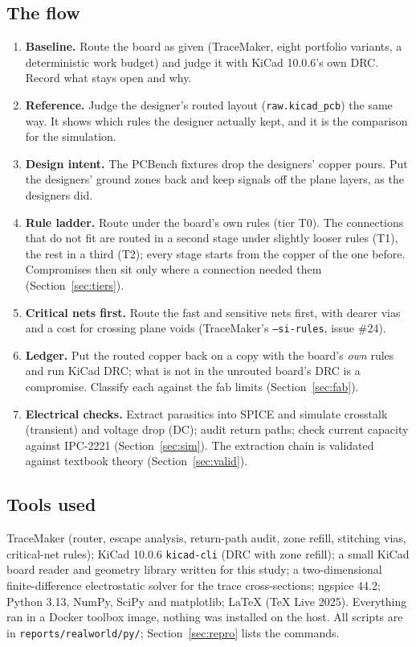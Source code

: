 \documentclass[10pt,a4paper]{article}
\newcommand{\file}[1]{\texttt{\small #1}}
\begin{document}
\subsection{The flow}

\begin{enumerate}
\item \textbf{Baseline.} Route the board as given (TraceMaker, eight portfolio variants, a deterministic work budget) and judge it with KiCad 10.0.6's own DRC. Record what stays open and why.
\item \textbf{Reference.} Judge the designer's routed layout (\file{raw.kicad\_pcb}) the same way. It shows which rules the designer actually kept, and it is the comparison for the simulation.
\item \textbf{Design intent.} The PCBench fixtures drop the designers' copper pours. Put the designers' ground zones back and keep signals off the plane layers, as the designers did.
\item \textbf{Rule ladder.} Route under the board's own rules (tier T0). The connections that do not fit are routed in a second stage under slightly looser rules (T1), the rest in a third (T2); every stage starts from the copper of the one
before. Compromises then sit only where a connection needed them (Section~\ref{sec:tiers}).
\item \textbf{Critical nets first.} Route the fast and sensitive nets first, with dearer vias and a cost for crossing plane voids (TraceMaker's \texttt{--si-rules}, issue \#24).
\item \textbf{Ledger.} Put the routed copper back on a copy with the board's \emph{own} rules and run KiCad DRC; what is not in the unrouted board's DRC is a compromise. Classify each against the fab limits (Section~\ref{sec:fab}).
\item \textbf{Electrical checks.} Extract parasitics into SPICE and simulate crosstalk (transient) and voltage drop (DC); audit return paths; check current capacity against IPC-2221 (Section~\ref{sec:sim}). The extraction chain is validated against textbook theory (Section~\ref{sec:valid}).
\end{enumerate}

\subsection{Tools used}

TraceMaker (router, escape analysis, return-path audit, zone refill, stitching vias, critical-net rules); KiCad 10.0.6 \texttt{kicad-cli} (DRC with zone refill); a small KiCad board reader and geometry library written for this study;
a two-dimensional finite-difference electrostatic solver for the trace cross-sections; ngspice 44.2; Python 3.13, NumPy, SciPy and matplotlib; \LaTeX{} (TeX Live 2025). Everything ran in a Docker toolbox image,
nothing was installed on the host. All scripts are in \file{reports/realworld/py/}; Section~\ref{sec:repro} lists the commands.
\end{document}
